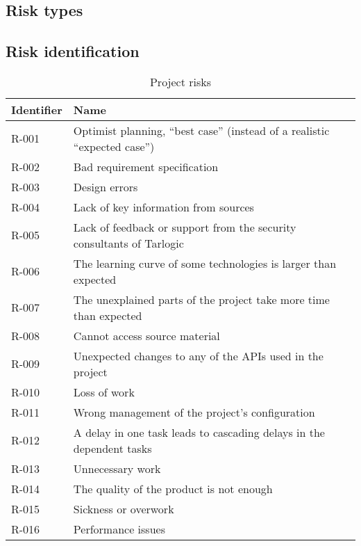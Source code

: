 \subsection{Risk types}

\subsection{Risk identification}

\begin{table}[H]
	\caption{Project risks}
	\begin{tabularx}{\textwidth}{|l|X|}
		\hline
		\rowcolor{gray!30}
		Identifier & Name \\ \hline
		R-001 & Optimist planning, ``best case'' (instead of a realistic ``expected case'')\\ \hline
		R-002 & Bad requirement specification\\ \hline
		R-003 & Design errors\\ \hline

		R-004 & Lack of key information from sources\\ \hline 		%
		R-005 & Lack of feedback or support from the security consultants of Tarlogic\\ \hline 		%
		R-006 & The learning curve of some technologies is larger than expected\\ \hline
		R-007 & The unexplained parts of the project take more time than expected\\ \hline

		R-008 & Cannot access source material\\ \hline 		%
		R-009 & Unexpected changes to any of the APIs used in the project\\ \hline

		R-010 & Loss of work\\ \hline 	%
		R-011 & Wrong management of the project's configuration\\ \hline 	%
		R-012 & A delay in one task leads to cascading delays in the dependent tasks\\ \hline

		R-013 & Unnecessary work\\ \hline 		%
		R-014 & The quality of the product is not enough\\ \hline 	%
		R-015 & Sickness or overwork\\ \hline
		R-016 & Performance issues\\ \hline 	%
	\end{tabularx}
\end{table}





